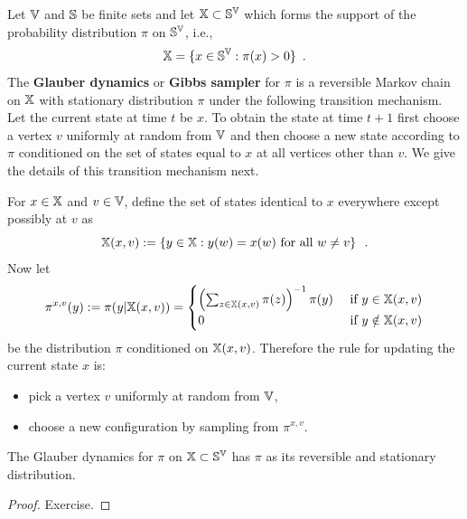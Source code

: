 \begin{definition}
Let $\mathbb{V}$ and $\mathbb{S}$ be finite sets and let $\mathbb{X} \subset \mathbb{S}^{\mathbb{V}}$ which forms the support of the probability distribution $\pi$ on $\mathbb{S}^{\mathbb{V}}$, i.e.,
\[
\mathbb{X} = \{x \in \mathbb{S}^{\mathbb{V}} : \pi(x)>0 \} \enspace .
\]
The {\bf Glauber dynamics} or {\bf Gibbs sampler} for $\pi$ is a reversible Markov chain on $\mathbb{X}$ with stationary distribution $\pi$ under the following transition mechanism.  
Let the current state at time $t$ be $x$.  
To obtain the state at time $t+1$ first choose a vertex $v$ uniformly at random from $\mathbb{V}$ and then choose a new state according to $\pi$ conditioned on the set of states equal to $x$ at all vertices other than $v$.  
We give the details of this transition mechanism next.  

For $x \in \mathbb{X}$ and $v \in \mathbb{V}$, define the set of states identical to $x$ everywhere except possibly at $v$ as
\[
\mathbb{X}(x,v) := \left\{ y \in \mathbb{X} : y(w) = x(w) \text{ for all } w \neq v \right\} \enspace .
\]
Now let 
\[
\pi^{x,v}(y) := \pi(y | \mathbb{X}(x,v)) = 
\begin{cases}
\left( \sum_{z \in \mathbb{X}(x,v)}{\pi(z)}\right)^{-1}{\pi(y)} & \text{ if } y \in \mathbb{X}(x,v) \\
0 & \text{ if } y \notin \mathbb{X}(x,v)
\end{cases}
\]
be the distribution $\pi$ conditioned on $\mathbb{X}(x,v)$.  Therefore the rule for updating the current state $x$ is:
\begin{itemize}
\item pick a vertex $v$ uniformly at random from $\mathbb{V}$,
\item choose a new configuration by sampling from $\pi^{x,v}$.
\end{itemize}
\end{definition}

\begin{prop}
The Glauber dynamics for $\pi$ on $\mathbb{X} \subset \mathbb{S}^{\mathbb{V}}$ has $\pi$ as its reversible and stationary distribution.
\begin{proof}
Exercise.
\end{proof}
\end{prop}

